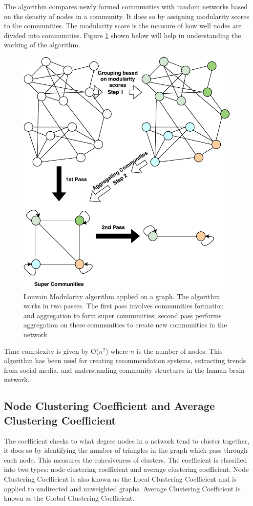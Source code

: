 \documentclass[journal,twoside,web]{ieeecolor}
\begin{document}
The algorithm compares newly formed communities with random networks based on the density of nodes in a community. It does so by assigning modularity scores to the communities. The modularity score is the measure of how well nodes are divided into communities. Figure \ref{fig7} shown below will help in understanding the working of the algorithm.

\begin{figure}[!h]
    \centerline{\includegraphics[scale=0.7]{figures/louvain.pdf}}
    \caption{Louvain Modularity algorithm applied on a graph. The algorithm works in two passes. The first pass involves communities formation and aggregation to form super communities; second pass performs aggregation on these communities to create new communities in the network}
    \label{fig7}
\end{figure}

Time complexity is given by O($n^2$) where $n$ is the number of nodes. This algorithm has been used for creating recommendation systems\cite{55}, extracting trends from social media\cite{56}, and understanding community structures in the human brain network\cite{57}.

\subsection{Node Clustering Coefficient and Average Clustering Coefficient}
The coefficient checks to what degree nodes in a network tend to cluster together, it does so by identifying the number of triangles in the graph which pass through each node. This measures the cohesiveness of clusters. The coefficient is classified into two types: node clustering coefficient and average clustering coefficient. Node Clustering Coefficient is also known as the Local Clustering Coefficient and is applied to undirected and unweighted graphs. Average Clustering Coefficient is known as the Global Clustering Coefficient.
\end{document}
